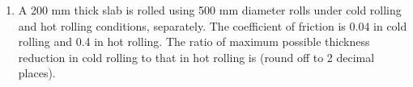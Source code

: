 \documentclass[12pt]{article}
\begin{document}
\begin{enumerate}
\item A 200 mm thick slab is rolled using 500 mm diameter rolls under cold rolling and hot rolling conditions, separately. The coefficient of friction is 0.04 in cold rolling and 0.4 in hot rolling. The ratio of maximum possible thickness reduction in cold rolling to that in hot rolling is \underline{\hspace{2cm}} (round off to 2 decimal places).















































































\end{enumerate}
\end{document}
